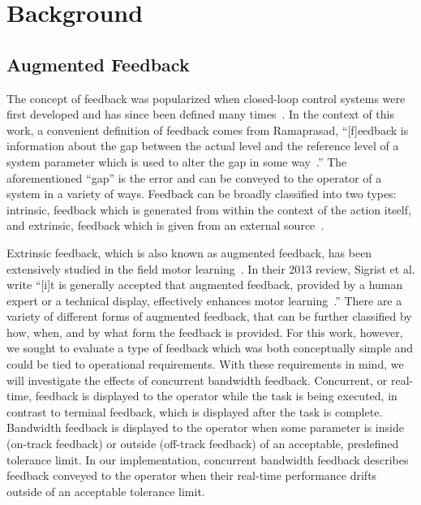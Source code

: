 \documentclass[float=false, crop=false]{standalone}
\begin{document}
\section{Background}
\subsection{Augmented Feedback}
The concept of feedback was popularized when closed-loop control systems were first developed and has since been defined many times~\cite{Wierner1948}.
In the context of this work, a convenient definition of feedback comes from Ramaprasad, ``[f]eedback is information about the gap between the actual level and the reference level of a system parameter which is used to alter the gap in some way~\cite{Ramaprasad1983}.''
The aforementioned ``gap'' is the error and can be conveyed to the operator of a system in a variety of ways.
Feedback can be broadly classified into two types: intrinsic, feedback which is generated from within the context of the action itself, and extrinsic, feedback which is given from an external source~\cite{laurillard1993rethinking}.

Extrinsic feedback, which is also known as augmented feedback, has been extensively studied in the field motor learning~\cite{Sigrist2013}.
In their 2013 review, Sigrist et al. write ``[i]t is generally accepted that augmented feedback, provided by a human expert or a technical display, effectively enhances motor learning~\cite{Sigrist2013}.''
There are a variety of different forms of augmented feedback, that can be further classified by how, when, and by what form the feedback is provided.
For this work, however, we sought to evaluate a type of feedback which was both conceptually simple and could be tied to operational requirements.
With these requirements in mind, we will investigate the effects of concurrent bandwidth feedback.
Concurrent, or real-time, feedback is displayed to the operator while the task is being executed, in contrast to terminal feedback, which is displayed after the task is complete.
Bandwidth feedback is displayed to the operator when some parameter is inside (on-track feedback) or outside (off-track feedback) of an acceptable, predefined tolerance limit.
In our implementation, concurrent bandwidth feedback describes feedback conveyed to the operator when their real-time performance drifts outside of an acceptable tolerance limit.
\end{document}
